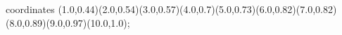 					coordinates { (1.0,0.44)(2.0,0.54)(3.0,0.57)(4.0,0.7)(5.0,0.73)(6.0,0.82)(7.0,0.82)(8.0,0.89)(9.0,0.97)(10.0,1.0)};